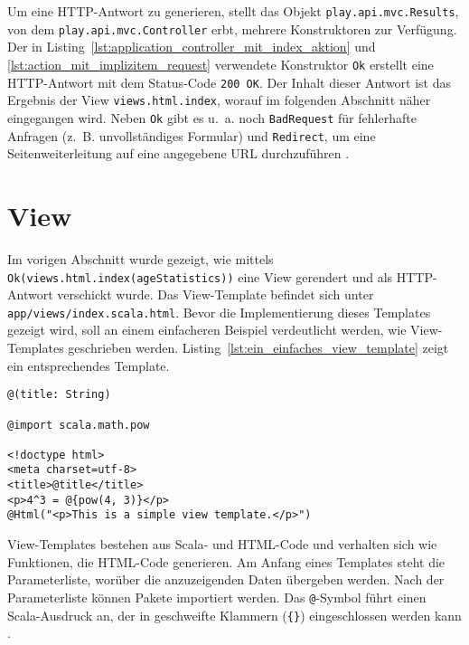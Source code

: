 Um eine HTTP-Antwort zu generieren, stellt das Objekt \lstinline|play.api.mvc.Results|, von dem \lstinline|play.api.mvc.Controller| erbt, mehrere Konstruktoren zur Verfügung.
Der in Listing~\ref{lst:application_controller_mit_index_aktion} und \ref{lst:action_mit_implizitem_request} verwendete Konstruktor \lstinline|Ok| erstellt eine HTTP-Antwort mit dem Status-Code \lstinline|200 OK|.
Der Inhalt dieser Antwort ist das Ergebnis der View \lstinline|views.html.index|, worauf im folgenden Abschnitt näher eingegangen wird.
Neben \lstinline|Ok| gibt es u.~a. noch \lstinline|BadRequest| für fehlerhafte Anfragen (z.~B. unvollständiges Formular) und \lstinline|Redirect|, um eine Seitenweiterleitung auf eine angegebene URL durchzuführen \cite[vgl.][]{play_controllers}.



\section{View} %
\label{sec:view}

Im vorigen Abschnitt wurde gezeigt, wie mittels \lstinline[breaklines=true]|Ok(views.html.index(ageStatistics))| eine View gerendert und als HTTP-Antwort verschickt wurde.
Das View-Template befindet sich unter \lstinline|app/views/index.scala.html|.
Bevor die Implementierung dieses Templates gezeigt wird, soll an einem einfacheren Beispiel verdeutlicht werden, wie View-Templates geschrieben werden.
Listing~\ref{lst:ein_einfaches_view_template} zeigt ein entsprechendes Template.

\begin{lstlisting}[caption=Ein einfaches View-Template, label=lst:ein_einfaches_view_template]
@(title: String)

@import scala.math.pow

<!doctype html>
<meta charset=utf-8>
<title>@title</title>
<p>4^3 = @{pow(4, 3)}</p>
@Html("<p>This is a simple view template.</p>")
\end{lstlisting}

View-Templates bestehen aus Scala- und HTML-Code und verhalten sich wie Funktionen, die HTML-Code generieren.
Am Anfang eines Templates steht die Parameterliste, worüber die anzuzeigenden Daten übergeben werden.
Nach der Parameterliste können Pakete importiert werden.
Das \lstinline|@|-Symbol führt einen Scala-Ausdruck an, der in geschweifte Klammern (\lstinline|{}|) eingeschlossen werden kann \cite[vgl.][]{play_templates}.

